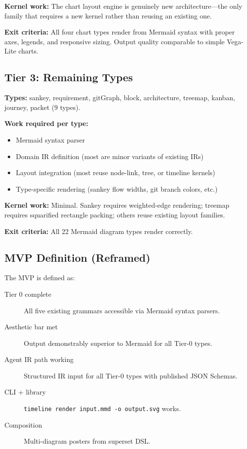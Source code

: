 \textbf{Kernel work:} The chart layout engine is genuinely new architecture---the only
family that requires a new kernel rather than reusing an existing one.

\textbf{Exit criteria:} All four chart types render from Mermaid syntax with proper axes,
legends, and responsive sizing. Output quality comparable to simple Vega-Lite charts.

\subsection{Tier 3: Remaining Types}

\textbf{Types:} sankey, requirement, gitGraph, block, architecture, treemap, kanban,
journey, packet (9 types).

\textbf{Work required per type:}
\begin{itemize}
  \item Mermaid syntax parser
  \item Domain IR definition (most are minor variants of existing IRs)
  \item Layout integration (most reuse node-link, tree, or timeline kernels)
  \item Type-specific rendering (sankey flow widths, git branch colors, etc.)
\end{itemize}

\textbf{Kernel work:} Minimal. Sankey requires weighted-edge rendering; treemap requires
squarified rectangle packing; others reuse existing layout families.

\textbf{Exit criteria:} All 22 Mermaid diagram types render correctly.

\subsection{MVP Definition (Reframed)}

The MVP is defined as:

\begin{description}
  \item[Tier 0 complete] All five existing grammars accessible via Mermaid syntax parsers.
  \item[Aesthetic bar met] Output demonstrably superior to Mermaid for all Tier-0 types.
  \item[Agent IR path working] Structured IR input for all Tier-0 types with published
        JSON Schemas.
  \item[CLI + library] \texttt{timeline render input.mmd -o output.svg} works.
  \item[Composition] Multi-diagram posters from superset DSL.
\end{description}

